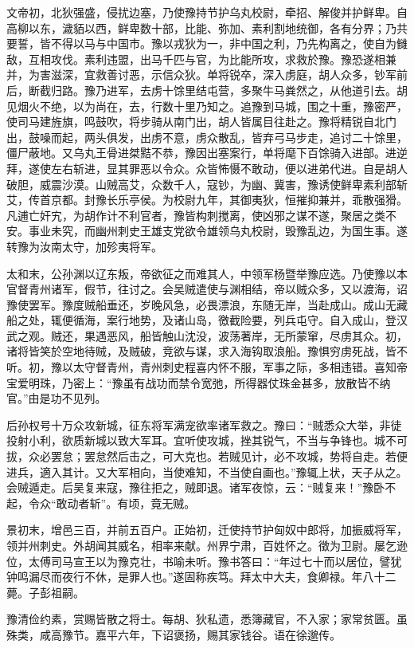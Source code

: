 \documentclass[12pt,UTF8]{ctexbook}
\begin{document}
文帝初，北狄强盛，侵扰边塞，乃使豫持节护乌丸校尉，牵招、解俊并护鲜卑。自高柳以东，濊貊以西，鲜卑数十部，比能、弥加、素利割地统御，各有分界；乃共要誓，皆不得以马与中国市。豫以戎狄为一，非中国之利，乃先构离之，使自为雠敌，互相攻伐。素利违盟，出马千匹与官，为比能所攻，求救於豫。豫恐遂相兼并，为害滋深，宜救善讨恶，示信众狄。单将锐卒，深入虏庭，胡人众多，钞军前后，断截归路。豫乃进军，去虏十馀里结屯营，多聚牛马粪然之，从他道引去。胡见烟火不绝，以为尚在，去，行数十里乃知之。追豫到马城，围之十重，豫密严，使司马建旌旗，鸣鼓吹，将步骑从南门出，胡人皆属目往赴之。豫将精锐自北门出，鼓噪而起，两头俱发，出虏不意，虏众散乱，皆弃弓马步走，追讨二十馀里，僵尸蔽地。又乌丸王骨进桀黠不恭，豫因出塞案行，单将麾下百馀骑入进部。进逆拜，遂使左右斩进，显其罪恶以令众。众皆怖慑不敢动，便以进弟代进。自是胡人破胆，威震沙漠。山贼高艾，众数千人，寇钞，为幽、冀害，豫诱使鲜卑素利部斩艾，传首京都。封豫长乐亭侯。为校尉九年，其御夷狄，恒摧抑兼并，乖散强猾。凡逋亡奸宄，为胡作计不利官者，豫皆构刺搅离，使凶邪之谋不遂，聚居之类不安。事业未究，而幽州刺史王雄支党欲令雄领乌丸校尉，毁豫乱边，为国生事。遂转豫为汝南太守，加殄夷将军。

太和末，公孙渊以辽东叛，帝欲征之而难其人，中领军杨暨举豫应选。乃使豫以本官督青州诸军，假节，往讨之。会吴贼遣使与渊相结，帝以贼众多，又以渡海，诏豫使罢军。豫度贼船垂还，岁晚风急，必畏漂浪，东随无岸，当赴成山。成山无藏船之处，辄便循海，案行地势，及诸山岛，徼截险要，列兵屯守。自入成山，登汉武之观。贼还，果遇恶风，船皆触山沈没，波荡著岸，无所蒙窜，尽虏其众。初，诸将皆笑於空地待贼，及贼破，竞欲与谋，求入海钩取浪船。豫惧穷虏死战，皆不听。初，豫以太守督青州，青州刺史程喜内怀不服，军事之际，多相违错。喜知帝宝爱明珠，乃密上：“豫虽有战功而禁令宽弛，所得器仗珠金甚多，放散皆不纳官。”由是功不见列。

后孙权号十万众攻新城，征东将军满宠欲率诸军救之。豫曰：“贼悉众大举，非徒投射小利，欲质新城以致大军耳。宜听使攻城，挫其锐气，不当与争锋也。城不可拔，众必罢怠；罢怠然后击之，可大克也。若贼见计，必不攻城，势将自走。若便进兵，適入其计。又大军相向，当使难知，不当使自画也。”豫辄上状，天子从之。会贼遁走。后吴复来寇，豫往拒之，贼即退。诸军夜惊，云：“贼复来！”豫卧不起，令众“敢动者斩”。有顷，竟无贼。

景初末，增邑三百，并前五百户。正始初，迁使持节护匈奴中郎将，加振威将军，领并州刺史。外胡闻其威名，相率来献。州界宁肃，百姓怀之。徵为卫尉。屡乞逊位，太傅司马宣王以为豫克壮，书喻未听。豫书答曰：“年过七十而以居位，譬犹钟鸣漏尽而夜行不休，是罪人也。”遂固称疾笃。拜太中大夫，食卿禄。年八十二薨。子彭祖嗣。

豫清俭约素，赏赐皆散之将士。每胡、狄私遗，悉簿藏官，不入家；家常贫匮。虽殊类，咸高豫节。嘉平六年，下诏褒扬，赐其家钱谷。语在徐邈传。
\end{document}
